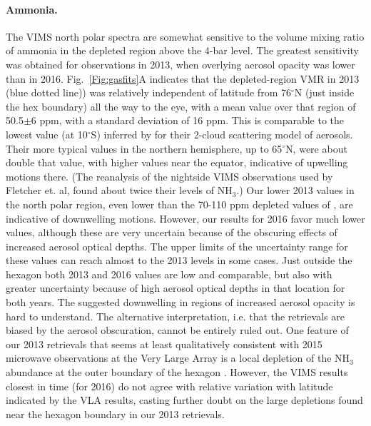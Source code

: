 \documentclass[article,11pt]{emulateapj}
\def\degx{$^\circ$}
\def\nht{NH$_3$ }
\def\nhtx{NH$_3$}
\begin{document}
\paragraph{Ammonia.} The VIMS north polar spectra are somewhat
sensitive to the volume mixing ratio of ammonia in the depleted region
above the 4-bar level. The greatest sensitivity was obtained
for observations in 2013, when
overlying aerosol opacity was lower than in 2016.
Fig.\ \ref{Fig:gasfits}A indicates that the depleted-region VMR in
2013 (blue dotted line)) was relatively independent of latitude from
76\degx N (just inside the hex boundary) all the way to the eye, with
a mean value over that region of 50.5$\pm$6 ppm, with a standard
deviation of 16 ppm.  This is comparable to the lowest value (at
10\degx S) inferred by \cite{Fletcher2011vims} for their 2-cloud
scattering model of aerosols. Their more typical values in the
northern hemisphere, up to 65\degx N, were about double that value,
with higher values near the equator, indicative of upwelling motions
there. (The \cite{Barstow2016} reanalysis of the nightside VIMS
observations used by Fletcher et. al, found about twice their levels
of \nhtx.)  Our lower 2013 values in the north polar region, even
lower than the 70-110 ppm depleted values of \cite{Briggs1989}, are
indicative of downwelling motions. However, our results for 2016 
favor much lower values, although these are very uncertain
because of the obscuring effects of increased aerosol optical
depths. The upper limits of the uncertainty range for these values can
reach almost to the 2013 levels in some cases.  Just outside the
hexagon both 2013 and 2016 values are low and comparable, but also
with greater uncertainty because of high aerosol optical depths in
that location for both years. The suggested downwelling in regions of
increased aerosol opacity is hard to understand.  The alternative
interpretation, i.e. that the retrievals are biased by the aerosol
obscuration, cannot be entirely ruled out.  One feature of our 2013
retrievals that seems at least qualitatively consistent with 2015
microwave observations at the Very Large Array is a local depletion of
the \nht abundance at the outer boundary of the hexagon
\citep{Li2020DPS}.  However, the VIMS results closest in time (for
2016) do not agree with relative variation with latitude
indicated by the VLA results, casting further doubt on the
large depletions found near the hexagon boundary in our 2013 retrievals.

\end{document}
